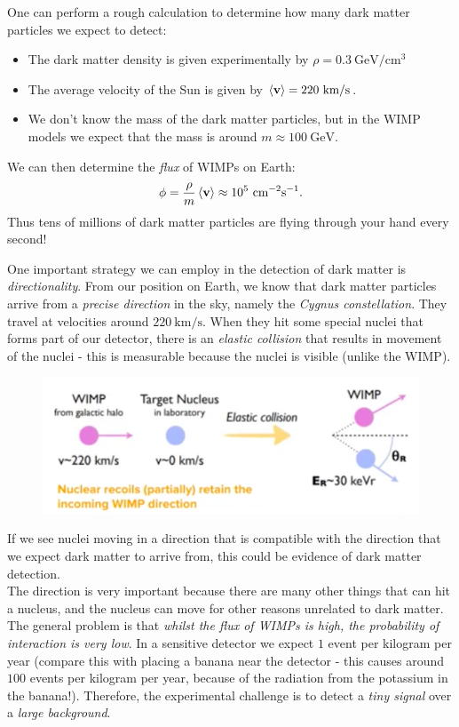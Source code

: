 One can perform a rough calculation to determine how many dark matter particles we expect to detect:
\begin{itemize}
\item The dark matter density is given experimentally by $\rho = 0.3\ \textrm{GeV}/\textrm{cm}^3$
\item The average velocity of the Sun is given by $\braket{\vec{v}} = 220\ \textrm{km}/\textrm{s}$.
\item We don't know the mass of the dark matter particles, but in the WIMP models we expect that the mass is around $m \approx 100\ \textrm{GeV}$. 
\end{itemize}
We can then determine the \textit{flux} of WIMPs on Earth:
\begin{equation*}
\phi = \frac{\rho}{m} \braket{\textbf{v}} \approx 10^5\ \textrm{cm}^{-2}\textrm{s}^{-1}.
\end{equation*}
Thus tens of millions of dark matter particles are flying through your hand every second!


\newpage
One important strategy we can employ in the detection of dark matter is \textit{directionality}. From our position on Earth,  we know that dark matter particles arrive from a \textit{precise direction} in the sky, namely the \textit{Cygnus constellation}. They travel at velocities around $220\ \textrm{km}/\textrm{s}$. When they hit some special nuclei that forms part of our detector, there is an \textit{elastic collision} that results in movement of the nuclei - this is measurable because the nuclei is visible (unlike the WIMP).
\begin{figure}[H]
\centering
\includegraphics[scale=0.4]{wimpscattering.png}
\end{figure}
If we see nuclei moving in a direction that is compatible with the direction that we expect dark matter to arrive from, this could be evidence of dark matter detection.\\

The direction is very important because there are many other things that can hit a nucleus, and the nucleus can move for other reasons unrelated to dark matter. The general problem is that \textit{whilst the flux of WIMPs is high, the probability of interaction is very low}. In a sensitive detector we expect $1$ event per kilogram per year (compare this with placing a banana near the detector - this causes around $100$ events per kilogram per year, because of the radiation from the potassium in the banana!). Therefore, the experimental challenge is to detect a \textit{tiny signal} over a \textit{large background}.

